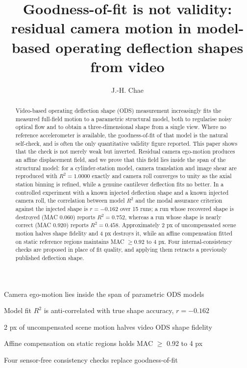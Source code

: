 \documentclass[preprint,12pt]{elsarticle}
\begin{document}
\begin{frontmatter}

\title{Goodness-of-fit is not validity: residual camera motion in
model-based operating deflection shapes from video}

\author[keti]{J.-H. Chae}


\begin{highlights}
\item Camera ego-motion lies inside the span of parametric ODS models
\item Model fit $R^2$ is anti-correlated with true shape accuracy, $r=-0.162$
\item 2 px of uncompensated scene motion halves video ODS shape fidelity
\item Affine compensation on static regions holds MAC $\ge$ 0.92 to 4 px
\item Four sensor-free consistency checks replace goodness-of-fit
\end{highlights}

\begin{abstract}
Video-based operating deflection shape (ODS) measurement increasingly fits
the measured full-field motion to a parametric structural model, both to
regularise noisy optical flow and to obtain a three-dimensional shape from a
single view. Where no reference accelerometer is available, the
goodness-of-fit of that model is the natural self-check, and is often the
only quantitative validity figure reported. This paper shows that the check
is not merely weak but inverted. Residual camera ego-motion produces an
affine displacement field, and we prove that this field lies inside the span
of the structural model: for a cylinder-station model, camera translation
and image shear are reproduced with $R^2 = 1.0000$ exactly and camera roll
converges to unity as the axial station binning is refined, while a genuine
cantilever deflection fits no better. In a controlled experiment with a
known injected deflection shape and a known injected camera roll, the
correlation between model $R^2$ and the modal assurance criterion against
the injected shape is $r = -0.162$ over 15 runs; a run whose recovered shape
is destroyed (MAC 0.060) reports $R^2 = 0.752$, whereas a run whose shape is
nearly correct (MAC 0.920) reports $R^2 = 0.458$. Approximately 2 px of
uncompensated scene motion halves shape fidelity and 4 px destroys it, while
an affine compensation fitted on static reference regions maintains
MAC $\ge 0.92$ to 4 px. Four internal-consistency checks are proposed in
place of fit quality, and applying them retracts a previously published
deflection shape.
\end{abstract}


\end{frontmatter}
\end{document}

